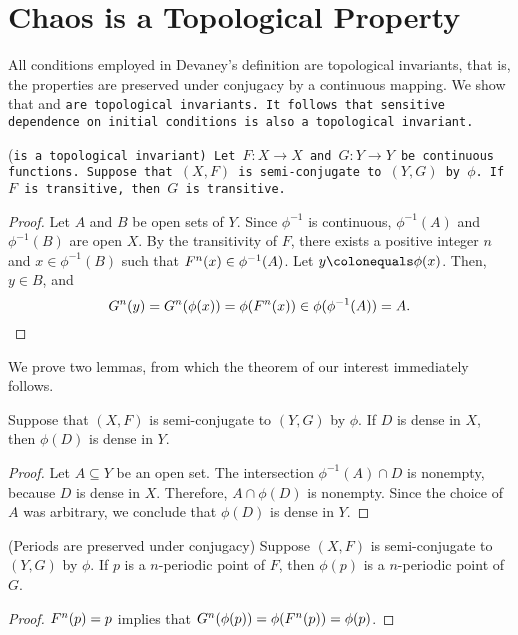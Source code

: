 \documentclass[10pt,draft,twoside]{book}
\begin{document}
\section{Chaos is a Topological Property}
All conditions employed in Devaney's definition are topological invariants, that is, the properties are preserved under conjugacy by a continuous mapping.
We show that \dpp and \tt are topological invariants.
It follows that sensitive dependence on initial conditions is also a topological invariant.
\begin{theorem}
  (\tt is a topological invariant) 
  Let $F: X \to X$ and $G: Y \to Y$ be continuous functions.
  Suppose that $(X,F)$ is semi-conjugate to $(Y,G)$ by $\phi$.
  If $F$ is transitive, then $G$ is transitive.
  \label{thm:conj-trans}
  \begin{proof}
    Let $A$ and $B$ be open sets of $Y$.
    Since $\phi^{-1}$ is continuous, $\phi^{-1}(A)$ and $\phi^{-1}(B)$ are open $X$.
    By the transitivity of $F$, there exists a positive integer $n$ and $x \in \phi^{-1}(B)$ such that $F^{n}(x)\in \phi^{-1}(A)$.
    Let $y \ceq \phi(x)$.
    Then, $y \in B$, and 
    \begin{equation*}
      G^{n}(y) 
      = G^{n}(\phi(x))
      = \phi(F^{n}(x)) \in \phi(\phi^{-1}(A)) = A.
    \end{equation*}
  \end{proof}
\end{theorem}
We prove two lemmas, from which the theorem of our interest immediately follows.
\begin{lemma}
  Suppose that $(X,F)$ is semi-conjugate to $(Y,G)$ by $\phi$.
  If $D$ is dense in $X$, then $\phi(D)$ is dense in $Y$.
  \label{thm:conj-dense}
  \begin{proof}
    Let $A \subseteq Y$ be an open set.
    The intersection $\phi^{-1} (A) \cap D$ is nonempty, because $D$ is dense in $X$.
    Therefore, $A \cap \phi(D)$ is nonempty.
    Since the choice of $A$ was arbitrary, we conclude that $\phi(D)$ is dense in $Y$.
  \end{proof}
\end{lemma}
\begin{lemma}
  (Periods are preserved under conjugacy)
  Suppose $(X,F)$ is semi-conjugate to $(Y,G)$ by $\phi$.
  If $p$ is a $n$-periodic point of $F$, then $\phi(p)$ is a $n$-periodic point of $G$.
  \label{thm:conj-per}
  \begin{proof}
    $F^{n}(p) = p$ implies that $G^{n}(\phi(p)) = \phi(F^{n}(p)) = \phi(p)$.
  \end{proof}
\end{lemma}
\end{document}
